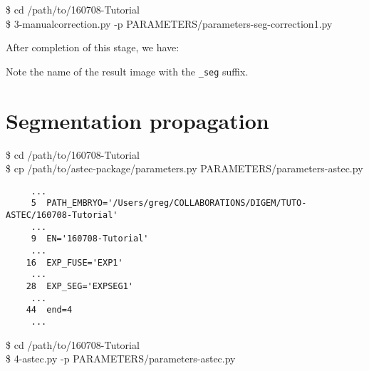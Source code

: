 \begin{code}{0.8}
\$ cd /path/to/160708-Tutorial\\
\$ 3-manualcorrection.py -p PARAMETERS/parameters-seg-correction1.py 
\end{code}

After completion of this stage, we have:

Note the name of the result image with the \texttt{\_seg} suffix.










\section{Segmentation propagation}


\begin{code}{0.8}
\$ cd /path/to/160708-Tutorial\\
\$ cp /path/to/astec-package/parameters.py PARAMETERS/parameters-astec.py\\
\end{code}



\begin{verbatim}
     ...
     5	PATH_EMBRYO='/Users/greg/COLLABORATIONS/DIGEM/TUTO-ASTEC/160708-Tutorial'	
     ...
     9	EN='160708-Tutorial'			
     ... 
    16	EXP_FUSE='EXP1'		
     ...
    28	EXP_SEG='EXPSEG1'
     ...
    44	end=4   
     ...
\end{verbatim}



\begin{code}{0.8}
\$ cd /path/to/160708-Tutorial\\
\$ 4-astec.py -p PARAMETERS/parameters-astec.py 
\end{code}






